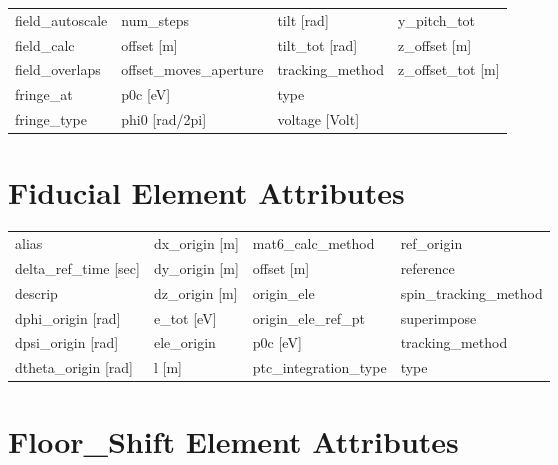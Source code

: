 \begin{tabular}{llll}
field_autoscale                & num_steps                      & tilt [rad]                     & y_pitch_tot                    \\
field_calc                     & offset [m]                     & tilt_tot [rad]                 & z_offset [m]                   \\
field_overlaps                 & offset_moves_aperture          & tracking_method                & z_offset_tot [m]               \\
fringe_at                      & p0c [eV]                       & type                           &                                \\
fringe_type                    & phi0 [rad/2pi]                 & voltage [Volt]                 &                                \\
 \bottomrule
 \end{tabular}
 \vfill
 
 \section{Fiducial Element Attributes}
 \label{s:list.fiducial}
 
 \begin{tabular}{llll} \toprule
alias                          & dx_origin [m]                  & mat6_calc_method               & ref_origin                     \\
delta_ref_time [sec]           & dy_origin [m]                  & offset [m]                     & reference                      \\
descrip                        & dz_origin [m]                  & origin_ele                     & spin_tracking_method           \\
dphi_origin [rad]              & e_tot [eV]                     & origin_ele_ref_pt              & superimpose                    \\
dpsi_origin [rad]              & ele_origin                     & p0c [eV]                       & tracking_method                \\
dtheta_origin [rad]            & l [m]                          & ptc_integration_type           & type                           \\
 \bottomrule
 \end{tabular}
 \vfill
 
 \section{Floor_Shift Element Attributes}
 \label{s:list.floor.shift}
 
